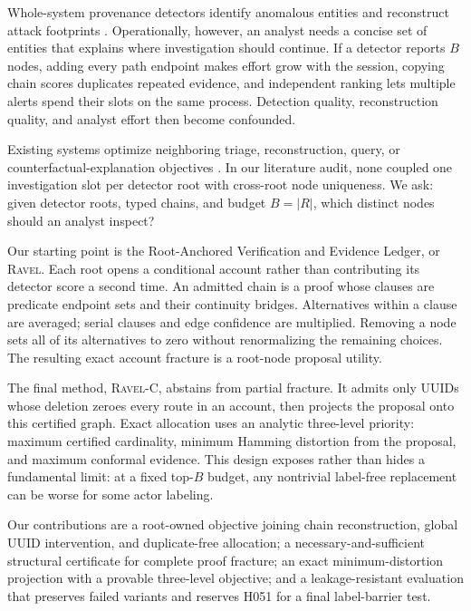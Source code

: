 \documentclass[runningheads]{llncs}
\newcommand{\ravel}{\textsc{Ravel}}
\newcommand{\ravelc}{\textsc{Ravel-C}}
\begin{document}
Whole-system provenance detectors identify anomalous entities and reconstruct attack footprints \cite{cheng2024kairos,jiang2025orthrus}. Operationally, however, an analyst needs a concise set of entities that explains where investigation should continue. If a detector reports \(B\) nodes, adding every path endpoint makes effort grow with the session, copying chain scores duplicates repeated evidence, and independent ranking lets multiple alerts spend their slots on the same process. Detection quality, reconstruction quality, and analyst effort then become confounded.

Existing systems optimize neighboring triage, reconstruction, query, or counterfactual-explanation objectives \cite{cheng2024kairos,jiang2025orthrus,wu2025provx}. In our literature audit, none coupled one investigation slot per detector root with cross-root node uniqueness. We ask: given detector roots, typed chains, and budget \(B=|R|\), which distinct nodes should an analyst inspect?

Our starting point is the Root-Anchored Verification and Evidence Ledger, or \ravel. Each root opens a conditional account rather than contributing its detector score a second time. An admitted chain is a proof whose clauses are predicate endpoint sets and their continuity bridges. Alternatives within a clause are averaged; serial clauses and edge confidence are multiplied. Removing a node sets all of its alternatives to zero without renormalizing the remaining choices. The resulting exact account fracture is a root-node proposal utility.

The final method, \ravelc, abstains from partial fracture. It admits only UUIDs whose deletion zeroes every route in an account, then projects the proposal onto this certified graph. Exact allocation uses an analytic three-level priority: maximum certified cardinality, minimum Hamming distortion from the proposal, and maximum conformal evidence. This design exposes rather than hides a fundamental limit: at a fixed top-\(B\) budget, any nontrivial label-free replacement can be worse for some actor labeling.

Our contributions are a root-owned objective joining chain reconstruction, global UUID intervention, and duplicate-free allocation; a necessary-and-sufficient structural certificate for complete proof fracture; an exact minimum-distortion projection with a provable three-level objective; and a leakage-resistant evaluation that preserves failed variants and reserves H051 for a final label-barrier test.
\end{document}
